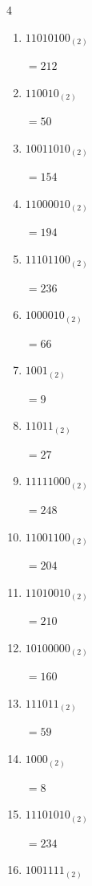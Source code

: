 \begin{multicols}{4}
\begin{enumerate}
        $=220$

  \item $11010100_{(2)}$

        $=212$

  \item $110010_{(2)}$

        $=50$

  \item $10011010_{(2)}$

        $=154$

  \item $11000010_{(2)}$

        $=194$

  \item $11101100_{(2)}$

        $=236$

  \item $1000010_{(2)}$

        $=66$

  \item $1001_{(2)}$

        $=9$

  \item $11011_{(2)}$

        $=27$

\columnbreak %

  \item $11111000_{(2)}$

        $=248$

  \item $11001100_{(2)}$

        $=204$

  \item $11010010_{(2)}$

        $=210$

  \item $10100000_{(2)}$

        $=160$

  \item $111011_{(2)}$

        $=59$

  \item $1000_{(2)}$

        $=8$

  \item $11101010_{(2)}$

        $=234$

  \item $1001111_{(2)}$


\end{enumerate}
\end{multicols}
